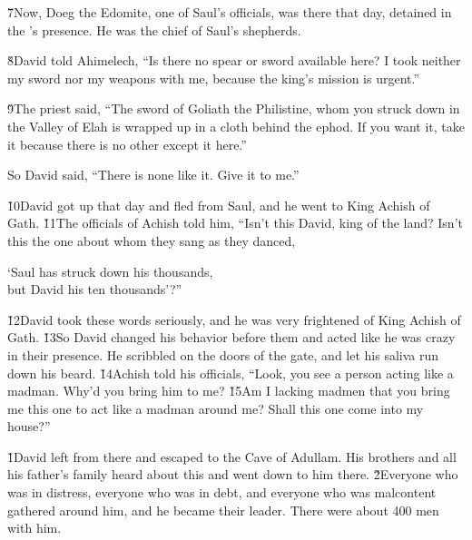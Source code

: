 \v{7}Now, Doeg the Edomite, one of Saul's officials, was there that day, detained in the 's presence. He was the chief of Saul's shepherds.

\v{8}David told Ahimelech, ``Is there no spear or sword available here? I took neither my sword nor my weapons with me, because the king's mission is urgent.''

\v{9}The priest said, ``The sword of Goliath the Philistine, whom you struck down in the Valley of Elah is wrapped up in a cloth behind the ephod. If you want it, take it because there is no other except it here.''

So David said, ``There is none like it. Give it to me.''

\v{10}David got up that day and fled from Saul, and he went to King Achish of Gath. \v{11}The officials of Achish told him, ``Isn't this David, king of the land? Isn't this the one about whom they sang as they danced,

\begin{poetry}
\poeml `Saul has struck down his thousands, \\
\poemll    but David his ten thousands'?''
\end{poetry}

\v{12}David took these words seriously, and he was very frightened of King Achish of Gath. \v{13}So David changed his behavior before them and acted like he was crazy in their presence. He scribbled on the doors of the gate, and let his saliva run down his beard. \v{14}Achish told his officials, ``Look, you see a person acting like a madman. Why'd you bring him to me? \v{15}Am I lacking madmen that you bring me this one to act like a madman around me? Shall this one come into my house?''

\v{1}David left from there and escaped to the Cave of Adullam. His brothers and all his father's family heard about this and went down to him there. \v{2}Everyone who was in distress, everyone who was in debt, and everyone who was malcontent gathered around him, and he became their leader. There were about 400 men with him.

